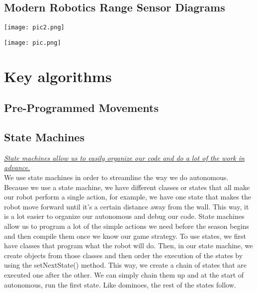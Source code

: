 \documentclass{article}
\begin{document}


\subsection{Modern Robotics Range Sensor Diagrams}
\begin{center}

{\texttt{[image: pic2.png]}}


{\texttt{[image: pic.png]}}

\end{center}



\section{Key algorithms}

\subsection{Pre-Programmed Movements}

\subsection{State Machines}
\textit{\underline{State machines allow us to easily organize our code and do a lot of the work in advance.}} \\

We use state machines in order to streamline the way we do autonomous. Because we use a state machine, we have different classes or states that all make our robot perform a single action, for example, we have one state that makes the robot move forward until it’s a certain distance away from the wall. This way, it is a lot easier to organize our autonomous and debug our code.  State machines allow us to program a lot of the simple actions we need before the season begins and then compile them once we know our game strategy. To use states, we first have classes that program what the robot will do. Then, in our state machine, we create objects from those classes and then order the execution of the states by using the setNextState() method. This way, we create a chain of states that are executed one after the other. We can simply chain them up and at the start of autonomous, run the first state. Like dominoes, the rest of the states follow. 
\end{document}
